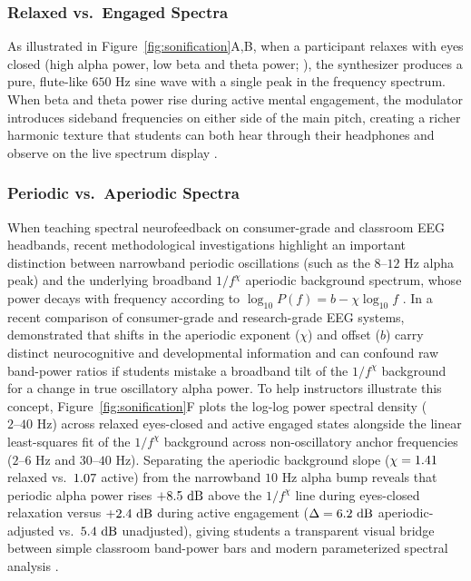 \documentclass[11pt]{article}
\begin{document}
\subsubsection{Relaxed vs.\ Engaged Spectra}
As illustrated in Figure~\ref{fig:sonification}A,B, when a participant relaxes with eyes closed (high alpha power, low beta and theta power; \citealp{takabatake2021musical}), the synthesizer produces a pure, flute-like $650\text{ Hz}$ sine wave with a single peak in the frequency spectrum. When beta and theta power rise during active mental engagement, the modulator introduces sideband frequencies on either side of the main pitch, creating a richer harmonic texture that students can both hear through their headphones and observe on the live spectrum display \citep{livingstone2018ravdess,monroydcroz2026minimalist}.

\subsubsection{Periodic vs.\ Aperiodic Spectra}
When teaching spectral neurofeedback on consumer-grade and classroom EEG headbands, recent methodological investigations highlight an important distinction between narrowband periodic oscillations (such as the $8\text{--}12\text{ Hz}$ alpha peak) and the underlying broadband $1/f^{\chi}$ aperiodic background spectrum, whose power decays with frequency according to $\log_{10} P(f) = b - \chi \log_{10} f$ \citep{cannard2021validating,sabio2024scoping,vanbueren2026comparing,dekleijn2023short}. In a recent comparison of consumer-grade and research-grade EEG systems, \citet{vanbueren2026comparing} demonstrated that shifts in the aperiodic exponent ($\chi$) and offset ($b$) carry distinct neurocognitive and developmental information and can confound raw band-power ratios if students mistake a broadband tilt of the $1/f^{\chi}$ background for a change in true oscillatory alpha power. To help instructors illustrate this concept, Figure~\ref{fig:sonification}F plots the log-log power spectral density ($2\text{--}40\text{ Hz}$) across relaxed eyes-closed and active engaged states alongside the linear least-squares fit of the $1/f^{\chi}$ background across non-oscillatory anchor frequencies ($2\text{--}6\text{ Hz}$ and $30\text{--}40\text{ Hz}$). Separating the aperiodic background slope ($\chi = 1.41$ relaxed vs.\ $1.07$ active) from the narrowband $10\text{ Hz}$ alpha bump reveals that periodic alpha power rises $+8.5\text{ dB}$ above the $1/f^{\chi}$ line during eyes-closed relaxation versus $+2.4\text{ dB}$ during active engagement ($\Delta = 6.2\text{ dB}$ aperiodic-adjusted vs.\ $5.4\text{ dB}$ unadjusted), giving students a transparent visual bridge between simple classroom band-power bars and modern parameterized spectral analysis \citep{cannard2021validating,vanbueren2026comparing}.
\end{document}
